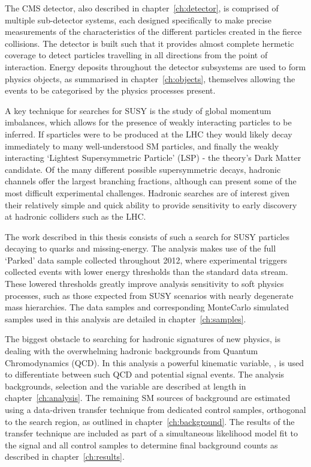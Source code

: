 The CMS detector, also described in chapter~\ref{ch:detector}, is comprised of
multiple sub-detector systems, each designed
specifically to make precise measurements of the characteristics of the
different particles created in the fierce collisions. The detector is built such
that it provides almost
complete hermetic coverage to detect particles travelling in all directions
from the point of interaction. Energy deposits throughout the detector
subsystems are used to form physics objects, as summarised in
chapter~\ref{ch:objects}, themselves allowing the events to be categorised by
the physics processes present.

A key technique
for searches for SUSY is the study of global momentum imbalances,
which allows for the presence of weakly interacting particles to be inferred.
If sparticles were to be produced at the LHC they would likely decay immediately
to many well-understood SM particles, and finally the weakly interacting
`Lightest Supersymmetric Particle' (LSP) - the theory's Dark Matter candidate.
Of the many different possible supersymmetric decays, hadronic channels offer
the largest branching fractions, although can present some of the most
difficult experimental challenges. Hadronic searches are of interest given their
relatively simple and quick ability to provide sensitivity to early discovery at
hadronic colliders such as the LHC.

The work described in this thesis consists of such a search for SUSY particles
decaying to quarks and missing-energy. The analysis makes use of the full
`Parked' data sample collected throughout 2012, where experimental
triggers collected events with lower energy thresholds than the standard data
stream.
These lowered thresholds greatly improve analysis sensitivity to soft
physics
processes, such as those expected from SUSY scenarios with nearly degenerate
mass hierarchies. The data samples and corresponding MonteCarlo simulated
samples used in this analysis are detailed in chapter~\ref{ch:samples}.

The biggest obstacle to
searching for hadronic signatures of new physics, is dealing with the
overwhelming hadronic backgrounds from Quantum Chromodynamics (QCD). In this
analysis a powerful kinematic variable, \alphat, is used to differentiate
between such QCD and potential signal events. The analysis backgrounds,
selection and
the \alphat variable are described at length in chapter~\ref{ch:analysis}. The
remaining SM sources of background are estimated using a data-driven transfer
technique from dedicated control samples, orthogonal to the search region, as
outlined in chapter~\ref{ch:background}. The results of the transfer technique
are included as part of a simultaneous likelihood model fit to the signal and
all control samples to determine final background counts as described in
chapter~\ref{ch:results}.

